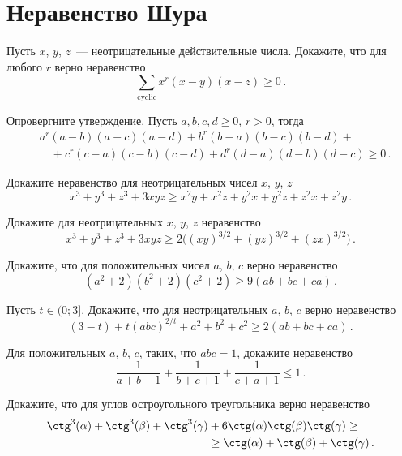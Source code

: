 
\section*{Неравенство Шура}


\begin{problems}

\item
Пусть $x$, $y$, $z$~— неотрицательные действительные числа.
Докажите, что для любого $r$ верно неравенство
\[
    \sum_{\mathrm{cyclic}}
        x^r (x - y) (x - z)
\geq
    0
\, . \]

\item
Опровергните утверждение.
Пусть $a, b, c, d \geq 0$, $r > 0$, тогда
\begin{align*} &
    a^r (a - b) (a - c) (a - d) +
    b^r (b - a) (b - c) (b - d)
    + {} \\ & \quad +
    c^r (c - a) (c - b) (c - d) +
    d^r (d - a) (d - b) (d - c)
\geq
    0
\, . \end{align*}

\item
Докажите неравенство для неотрицательных чисел $x$, $y$, $z$
\[
    x^3 + y^3 + z^3 + 3 x y z
\geq
    x^2 y + x^2 z + y^2 x + y^2 z + z^2 x + z^2 y
\, . \]

\item
Докажите для неотрицательных $x$, $y$, $z$ неравенство
\[
    x^3 + y^3 + z^3 + 3 x y z
\geq
    2 \bigl( (x y)^{3/2} + (y z)^{3/2} + (z x)^{3/2} \bigr)
\, . \]

\item
Докажите, что для положительных чисел $a$, $b$, $c$ верно неравенство
\[
    (a^2 + 2) (b^2 + 2) (c^2 + 2)
\geq
    9 (a b + b c + c a)
\, . \]

\item
Пусть $t \in (0; 3]$.
Докажите, что для неотрицательных $a$, $b$, $c$ верно неравенство
\[
    (3 - t) + t (a b c)^{2/t} + a^2 + b^2 + c^2
\geq
    2 (a b + b c + c a)
\, . \]

\item
Для положительных $a$, $b$, $c$, таких, что $a b c  = 1$, докажите
неравенство
\[
    \frac{1}{a + b + 1} +
    \frac{1}{b + c + 1} +
    \frac{1}{c + a + 1}
\leq
    1
\, . \]

\item
Докажите, что для углов остроугольного треугольника верно неравенство
\begin{align*}
    \ctg^3(\alpha) + \ctg^3(\beta) + \ctg^3(\gamma)
    & +
    6 \ctg(\alpha) \ctg(\beta) \ctg(\gamma)
\geq \\ & \geq
    \ctg(\alpha) + \ctg(\beta) + \ctg(\gamma)
\, . \end{align*}


\end{problems}
